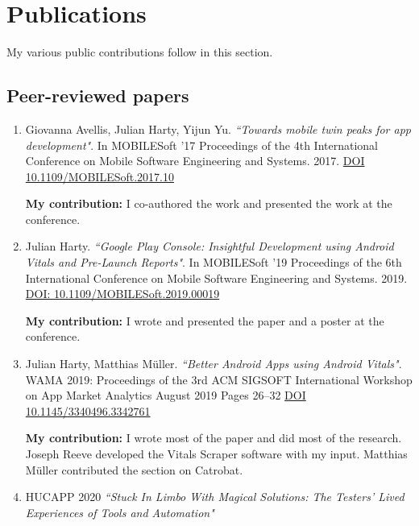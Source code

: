 \section{Publications}
My various public contributions follow in this section.

\subsection{Peer-reviewed papers}
\begin{enumerate}
    \item 	Giovanna Avellis, Julian Harty, Yijun Yu. \emph{``Towards mobile twin peaks for app development"}. In MOBILESoft '17 Proceedings of the 4th International Conference on Mobile Software Engineering and Systems. 2017. \href{https://doi.org/10.1109/MOBILESoft.2017.10}{DOI 10.1109/MOBILESoft.2017.10}~\cite{avellis_harty_yu_towards_mobile_twin_peaks}
    
    \textbf{My contribution:} I co-authored the work and presented the work at the conference.
    \item Julian Harty. \emph{``Google Play Console: Insightful Development using Android Vitals and Pre-Launch Reports"}. In MOBILESoft '19 Proceedings of the 6th International Conference on Mobile Software Engineering and Systems. 2019. \href{https://doi.org/10.1109/MOBILESoft.2019.00019}{DOI: 10.1109/MOBILESoft.2019.00019} ~\cite{harty_google_play_console_insightful_development_using_android_vitals_and_pre_launch_reports}
    
    \textbf{My contribution:} I wrote and presented the paper and a poster at the conference.
    
    \item Julian Harty, Matthias Müller. \emph{``Better Android Apps using Android Vitals"}.  WAMA 2019: Proceedings of the 3rd ACM SIGSOFT International Workshop on App Market Analytics August 2019 Pages 26–32 \href{https://doi.org/10.1145/3340496.3342761}{DOI 10.1145/3340496.3342761}~\cite{harty_better_android_apps_using_android_vitals}
    
    \textbf{My contribution:} I wrote most of the paper and did most of the research. Joseph Reeve developed the Vitals Scraper software with my input. Matthias Müller contributed the section on Catrobat.
    
    \item HUCAPP 2020 \emph{``Stuck In Limbo With Magical Solutions: The Testers’ Lived Experiences of Tools and Automation"}
    

\end{enumerate}
